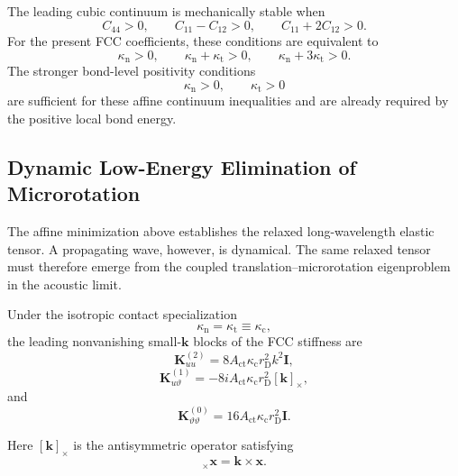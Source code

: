 The leading cubic continuum is mechanically stable when
\begin{equation}
    C_{44}>0, \qquad C_{11}-C_{12}>0, \qquad C_{11}+2C_{12}>0.
\end{equation}
For the present FCC coefficients, these conditions are equivalent to
\begin{equation}
    \kappa_{\mathrm{n}}>0, \qquad
    \kappa_{\mathrm{n}}+\kappa_{\mathrm{t}}>0, \qquad
    \kappa_{\mathrm{n}}+3\kappa_{\mathrm{t}}>0.
\end{equation}
The stronger bond-level positivity conditions
\begin{equation}
    \kappa_{\mathrm{n}}>0, \qquad \kappa_{\mathrm{t}}>0
\end{equation}
are sufficient for these affine continuum inequalities and are already required by the positive local bond energy.


\subsection{Dynamic Low-Energy Elimination of Microrotation}
\label{sec:fcc_dynamic_microrotation}

The affine minimization above establishes the relaxed long-wavelength elastic tensor. A propagating wave, however, is dynamical. The same relaxed tensor must therefore emerge from the coupled translation--microrotation eigenproblem in the acoustic limit.

Under the isotropic contact specialization
\begin{equation}
    \kappa_{\mathrm{n}}=\kappa_{\mathrm{t}}\equiv\kappa_{\mathrm{c}},
\end{equation}
the leading nonvanishing small-$\mathbf{k}$ blocks of the FCC stiffness are
\begin{equation}
    \mathbf{K}_{uu}^{(2)}
    =
    8A_{\mathrm{ct}}\kappa_{\mathrm{c}}r_{\mathrm{D}}^2k^2\mathbf{I},
\end{equation}
\begin{equation}
    \mathbf{K}_{u\vartheta}^{(1)}
    =
    -8iA_{\mathrm{ct}}\kappa_{\mathrm{c}}r_{\mathrm{D}}^2[\mathbf{k}]_{\times},
\end{equation}
and
\begin{equation}
    \mathbf{K}_{\vartheta\vartheta}^{(0)}
    =
    16A_{\mathrm{ct}}\kappa_{\mathrm{c}}r_{\mathrm{D}}^2\mathbf{I}.
\end{equation}

Here $[\mathbf{k}]_{\times}$ is the antisymmetric operator satisfying
\begin{equation}
    [\mathbf{k}]_{\times}\mathbf{x}
    =
    \mathbf{k}\times\mathbf{x}.
\end{equation}


